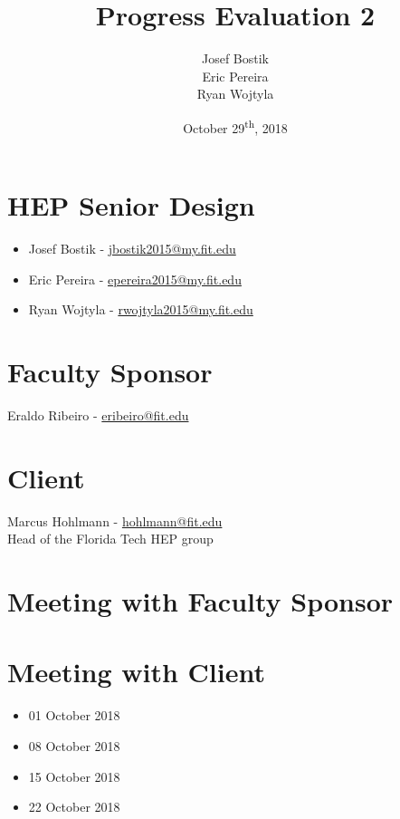 \documentclass[12pt]{article}
\newcommand\tab[1][1cm]{\hspace*{#1}}
\begin{document}
\begin{titlepage}
	

\author{Josef Bostik\\
	Eric Pereira\\
	Ryan Wojtyla\\}
\date{October 29\textsuperscript{th}, 2018}
\title{Progress Evaluation 2}
\maketitle
\end{titlepage}
\tableofcontents
\newpage {}
\section{HEP Senior Design}
\begin{itemize}
	\item Josef Bostik - \href{mailto:jbostik2015@my.fit.edu}{jbostik2015@my.fit.edu}
	\item Eric Pereira - \href{mailto:epereira2015@my.fit.edu}{epereira2015@my.fit.edu }
	\item Ryan Wojtyla - \href{mailto:rwojtyla2015@my.fit.edu}{rwojtyla2015@my.fit.edu}
\end{itemize}

\section{Faculty Sponsor}
\tab Eraldo Ribeiro - \href{mailto:eribeiro@fit.edu}{eribeiro@fit.edu}
\section{Client}
\tab Marcus Hohlmann - \href{mailto:hohlmann@fit.edu}{hohlmann@fit.edu} \\ 
\tab Head of the Florida Tech HEP group
\section{Meeting with Faculty Sponsor}
\section{Meeting with Client}
\begin{itemize}
  \item[] 01 October 2018
  \item[] 08 October 2018
  \item[] 15 October 2018
  \item[] 22 October 2018
\end{itemize}
\end{document}
